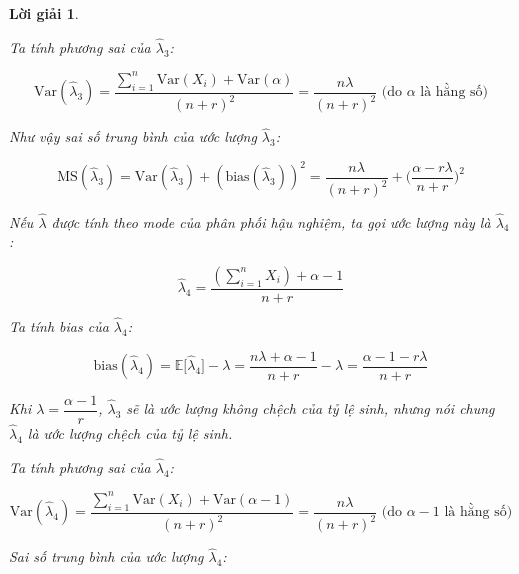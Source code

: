 \documentclass[14pt, a4paper]{article}
\theoremstyle{sltheorem}
\theoremstyle{soltheorem}
\newtheorem*{loigiai}{Lời giải}
\begin{document}
\begin{loigiai}
\begin{enumerate}
\begin{itemize}
            Ta tính phương sai của $\hat{\lambda}_3$:
            
            \begin{equation*}
                \text{Var}(\hat{\lambda}_3) = \dfrac{\sum_{i=1}^n \text{Var}(X_i) + \text{Var}(\alpha)}{(n+r)^2} = \dfrac{n\lambda}{(n+r)^2} \text{ (do } \alpha \text{ là hằng số)}
            \end{equation*}

            Như vậy sai số trung bình của ước lượng $\hat{\lambda}_3$:

            \begin{equation*}
                \text{MS}(\hat{\lambda}_3) = \text{Var}(\hat{\lambda}_3) + (\text{bias}(\hat{\lambda}_3))^2 = \dfrac{n\lambda}{(n+r)^2} + \Big( \dfrac{\alpha - r\lambda}{n + r} \Big)^2
            \end{equation*}
            
            Nếu $\hat{\lambda}$ được tính theo mode của phân phối hậu nghiệm,
            ta gọi ước lượng này là $\hat{\lambda}_4$:

            \begin{equation*}
                \hat{\lambda}_4 = \dfrac{(\sum_{i=1}^n X_i) + \alpha - 1}{n + r}
            \end{equation*}

            Ta tính bias của $\hat{\lambda}_4$:

            \begin{equation*}
                \text{bias}(\hat{\lambda}_4) = \mathbb{E} \lbrack \hat{\lambda}_4 \rbrack - \lambda = \dfrac{n\lambda + \alpha - 1}{n + r} - \lambda = \dfrac{\alpha - 1 - r\lambda}{n + r}
            \end{equation*}

            Khi $\lambda = \dfrac{\alpha - 1}{r}$, $\hat{\lambda}_3$ sẽ là ước lượng không chệch của tỷ lệ sinh, nhưng nói chung $\hat{\lambda}_4$ là ước lượng chệch của tỷ lệ sinh.

            Ta tính phương sai của $\hat{\lambda}_4$:

            \begin{equation*}
                \text{Var}(\hat{\lambda}_4) = \dfrac{\sum_{i=1}^n \text{Var}(X_i) + \text{Var}(\alpha-1)}{(n+r)^2} = \dfrac{n\lambda}{(n+r)^2} \text{ (do } \alpha - 1 \text{ là hằng số)}
            \end{equation*}

            Sai số trung bình của ước lượng $\hat{\lambda}_4$:


\end{itemize}
\end{enumerate}
\end{loigiai}
\end{document}
